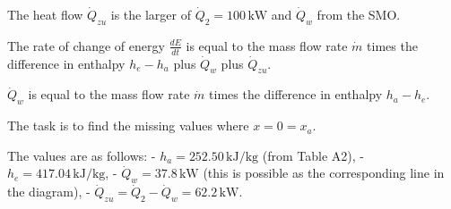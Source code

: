 The heat flow \( \dot{Q}_{zu} \) is the larger of \( \dot{Q}_2 = 100 \, \text{kW} \) and \( \dot{Q}_w \) from the SMO.

The rate of change of energy \( \frac{dE}{dt} \) is equal to the mass flow rate \( \dot{m} \) times the difference in enthalpy \( h_e - h_a \) plus \( \dot{Q}_w \) plus \( \dot{Q}_{zu} \).

\( \dot{Q}_w \) is equal to the mass flow rate \( \dot{m} \) times the difference in enthalpy \( h_a - h_e \).

The task is to find the missing values where \( x = 0 = x_a \).

The values are as follows:
- \( h_a = 252.50 \, \text{kJ/kg} \) (from Table A2),
- \( h_e = 417.04 \, \text{kJ/kg} \),
- \( \dot{Q}_w = 37.8 \, \text{kW} \) (this is possible as the corresponding line in the diagram),
- \( \dot{Q}_{zu} = \dot{Q}_2 - \dot{Q}_w = 62.2 \, \text{kW} \).